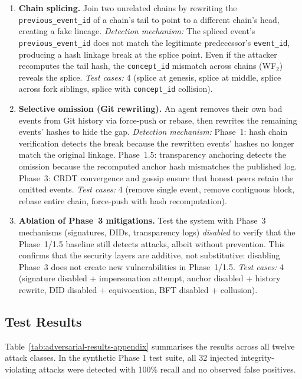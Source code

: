 \begin{enumerate}[label=\textbf{A\arabic*}, leftmargin=3em]
    \item \textbf{Chain splicing.} Join two unrelated chains by rewriting the \texttt{previous\_event\_id} of a chain's tail to point to a different chain's head, creating a fake lineage. \emph{Detection mechanism:} The spliced event's \texttt{previous\_event\_id} does not match the legitimate predecessor's \texttt{event\_id}, producing a hash linkage break at the splice point. Even if the attacker recomputes the tail hash, the \texttt{concept\_id} mismatch across chains (WF$_2$) reveals the splice. \emph{Test cases:} 4 (splice at genesis, splice at middle, splice across fork siblings, splice with \texttt{concept\_id} collision).

    \item \textbf{Selective omission (Git rewriting).} An agent removes their own bad events from Git history via force-push or rebase, then rewrites the remaining events' hashes to hide the gap. \emph{Detection mechanism:} Phase~1: hash chain verification detects the break because the rewritten events' hashes no longer match the original linkage. Phase~1.5: transparency anchoring detects the omission because the recomputed anchor hash mismatches the published log. Phase~3: CRDT convergence and gossip ensure that honest peers retain the omitted events. \emph{Test cases:} 4 (remove single event, remove contiguous block, rebase entire chain, force-push with hash recomputation).

    \item \textbf{Ablation of Phase~3 mitigations.} Test the system with Phase~3 mechanisms (signatures, DIDs, transparency logs) \emph{disabled} to verify that the Phase~1/1.5 baseline still detects attacks, albeit without prevention. This confirms that the security layers are additive, not substitutive: disabling Phase~3 does not create new vulnerabilities in Phase~1/1.5. \emph{Test cases:} 4 (signature disabled + impersonation attempt, anchor disabled + history rewrite, DID disabled + equivocation, BFT disabled + collusion).
\end{enumerate}

\subsection{Test Results}

Table~\ref{tab:adversarial-results-appendix} summarises the results across all twelve attack classes. In the synthetic Phase 1 test suite, all 32 injected integrity-violating attacks were detected with 100\% recall and no observed false positives.

